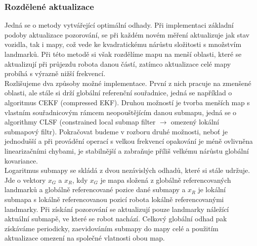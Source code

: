 \documentclass[11pt]{article}
\begin{document}
\subsubsection{Rozdělené aktualizace}
Jedná se o metody vytvářející optimální odhady. Při implementaci základní podoby aktualizace pozorování, se při každém novém měření aktualizuje jak stav vozidla, tak i mapy, což vede ke kvadratickému nárůstu složitosti s množstvím landmarků. Při této metodě si však rozdělíme mapu na menší oblasti, které se aktualizují při průjezdu robota danou částí, zatímco aktualizace celé mapy probíhá s výrazně nižší frekvencí.\\
\indent Rozlišujeme dva způsoby možné implementace. První z nich pracuje na zmenšené oblasti, ale stále si drží globální referenční souřadnice, jedná se například o algoritmus CEKF (compressed EKF). Druhou možností je tvorba menších map s vlastním souřadnicovým rámcem neopouštějícím danou submapu, jedná se o algorithmy CLSF (constrained local submap filter $\rightarrow$ omezený lokální submapový filtr). Pokračovat budeme v rozboru druhé možnosti, neboť je jednodušší a při provádění operací s velkou frekvencí opakování je méně ovlivněna linearizačními chybami, je stabilnější a zabraňuje příliš velkému nárůstu globální kovariance. \\
\indent Logaritmus submapy se skládá z dvou nezávislých odhadů, které si stále udržuje. Jde o vektory $x_G$ a $x_R$, kdy $x_G$ je mapa složená z globálně referencovaných landmarků a globálně referencované pozice dané submapy a $x_R$ je lokální submapa s lokálně referencovanou pozicí robota lokálně referencovanými landmarky. Při získání pozorování se aktualizují pouze landmarky náležící aktuální submapě, ve které se robot nachází. Celkový globální odhad pak získáváme periodicky, zaevidováním submapy do mapy celé a použitím aktualizace omezení na společné vlatnosti obou map.
\end{document}
